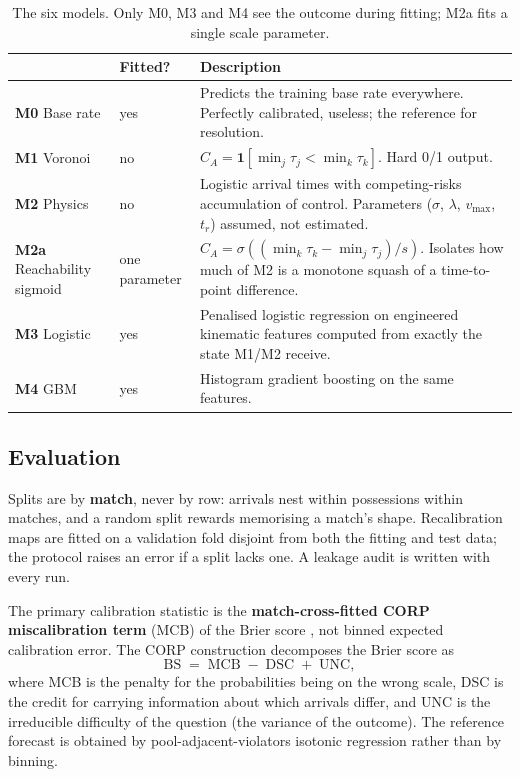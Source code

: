 \documentclass[11pt,a4paper]{article}
\begin{document}
\begin{table}[h]
\centering
\small
\caption{The six models. Only M0, M3 and M4 see the outcome during fitting;
M2a fits a single scale parameter.}
\label{tab:models}
\begin{tabularx}{\textwidth}{llX}
\toprule
& Fitted? & Description \\
\midrule
\textbf{M0} Base rate & yes & Predicts the training base rate everywhere.
  Perfectly calibrated, useless; the reference for resolution. \\
\textbf{M1} Voronoi & no & $C_A = \mathbf{1}[\min_j \tau_j < \min_k \tau_k]$.
  Hard 0/1 output. \\
\textbf{M2} Physics & no & Logistic arrival times with competing-risks
  accumulation of control. Parameters ($\sigma$, $\lambda$, $v_{\max}$, $t_r$)
  assumed, not estimated. \\
\textbf{M2a} Reachability sigmoid & one parameter &
  $C_A = \sigma\!\left((\min_k \tau_k - \min_j \tau_j)/s\right)$. Isolates how
  much of M2 is a monotone squash of a time-to-point difference. \\
\textbf{M3} Logistic & yes & Penalised logistic regression on engineered
  kinematic features computed from exactly the state M1/M2 receive. \\
\textbf{M4} GBM & yes & Histogram gradient boosting on the same features. \\
\bottomrule
\end{tabularx}
\end{table}

\subsection{Evaluation}

Splits are by \textbf{match}, never by row: arrivals nest within possessions
within matches, and a random split rewards memorising a match's shape.
Recalibration maps are fitted on a validation fold disjoint from both the fitting
and test data; the protocol raises an error if a split lacks one. A leakage audit
is written with every run.

The primary calibration statistic is the \textbf{match-cross-fitted CORP
miscalibration term} (MCB) of the Brier score \citep{dimitriadis2021corp}, not
binned expected calibration error. The CORP construction decomposes the Brier
score as
\[
  \mathrm{BS} \;=\; \mathrm{MCB} \;-\; \mathrm{DSC} \;+\; \mathrm{UNC},
\]
where MCB is the penalty for the probabilities being on the wrong scale, DSC is
the credit for carrying information about which arrivals differ, and UNC is the
irreducible difficulty of the question (the variance of the outcome). The
reference forecast is obtained by pool-adjacent-violators isotonic regression
rather than by binning.
\end{document}
